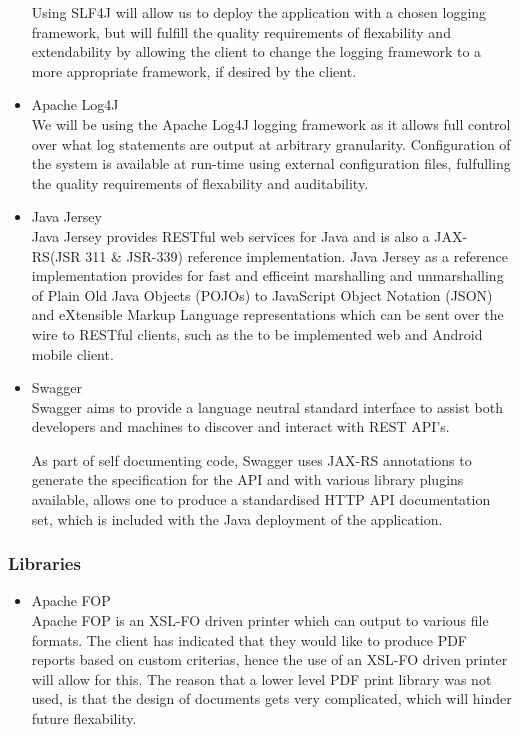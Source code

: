 \documentclass[a4paper,10pt]{article}
\begin{document}
\begin{itemize}
				Using SLF4J will allow us to deploy the application with a chosen logging framework, but will fulfill the quality requirements of flexability and extendability by allowing the client to change the logging framework to a more appropriate framework, if desired by the client.
			\item Apache Log4J\\
				We will be using the Apache Log4J logging framework as it allows full control over what log statements are output at arbitrary granularity.  Configuration of the system is available at run-time using external configuration files, fulfulling the quality requirements of flexability and auditability.
			\item Java Jersey\\
			Java Jersey provides RESTful web services for Java and is also a JAX-RS(JSR 311 \& JSR-339) reference implementation. Java Jersey as a reference implementation provides for fast and efficeint marshalling and unmarshalling of Plain Old Java Objects (POJOs) to JavaScript Object Notation (JSON) and eXtensible Markup Language representations which can be sent over the wire to RESTful clients, such as the to be implemented web and Android mobile client. 

			\item Swagger\\
				Swagger aims to provide a language neutral standard interface to assist both developers and machines to discover and interact with REST API's. 
				
				As part of self documenting code, Swagger uses JAX-RS annotations to generate the specification for the API and with various library plugins available, allows one to produce a standardised HTTP API documentation set, which is included with the Java deployment of the application.
		\end{itemize}

\subsubsection{Libraries}
	\begin{itemize}
		\item Apache FOP\\
			Apache FOP is an XSL-FO driven printer which can output to various file formats.  The client has indicated that they would like to produce PDF reports based on custom criterias, hence the use of an XSL-FO driven printer will allow for this. The reason that a lower level PDF print library was not used, is that the design of documents gets very complicated, which will hinder future flexability.
	\end{itemize}
\end{document}
